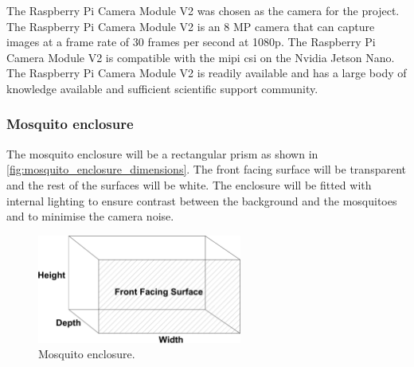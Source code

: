 The Raspberry Pi Camera Module V2 was chosen as the camera for the project. The Raspberry Pi Camera Module V2 is an 8 MP camera that can capture images at a frame rate of 30 frames per second at 1080p. The Raspberry Pi Camera Module V2 is compatible with the \gls{mipi} \gls{csi} on the Nvidia Jetson Nano. The Raspberry Pi Camera Module V2 is readily available and has a large body of knowledge available and sufficient scientific support community.



\subsubsection{Mosquito enclosure}
The mosquito enclosure will be a rectangular prism as shown in \autoref{fig:mosquito_enclosure_dimensions}. The front facing surface will be transparent and the rest of the surfaces will be white. The enclosure will be fitted with internal lighting to ensure contrast between the background and the mosquitoes and to minimise the camera noise.
\begin{figure}[!htb]
  \centering
  \includegraphics[width=0.6\textwidth]{figures/hardware_design/mos_enclosure.pdf}
  \caption{Mosquito enclosure.}
  \label{fig:mosquito_enclosure_dimensions}
\end{figure}



